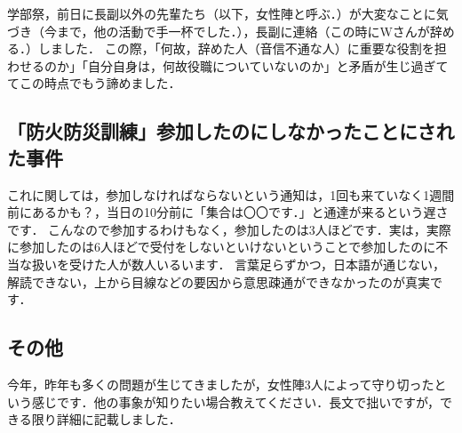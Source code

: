 \documentclass[a4paper,11pt]{ltjsarticle}
\begin{document}
学部祭，前日に長副以外の先輩たち（以下，女性陣と呼ぶ．）が大変なことに気づき（今まで，他の活動で手一杯でした．），長副に連絡（この時にWさんが辞める．）しました．
この際，「何故，辞めた人（音信不通な人）に重要な役割を担わせるのか」「自分自身は，何故役職についていないのか」と矛盾が生じ過ぎててこの時点でもう諦めました．

\subsection{「防火防災訓練」参加したのにしなかったことにされた事件}

これに関しては，参加しなければならないという通知は，1回も来ていなく1週間前にあるかも？，当日の10分前に「集合は〇〇です．」と通達が来るという遅さです．
こんなので参加するわけもなく，参加したのは3人ほどです．実は，実際に参加したのは6人ほどで受付をしないといけないということで参加したのに不当な扱いを受けた人が数人いるいます．
言葉足らずかつ，日本語が通じない，解読できない，上から目線などの要因から意思疎通ができなかったのが真実です．

\subsection{その他}

今年，昨年も多くの問題が生じてきましたが，女性陣3人によって守り切ったという感じです．他の事象が知りたい場合教えてください．長文で拙いですが，できる限り詳細に記載しました．
\end{document}
